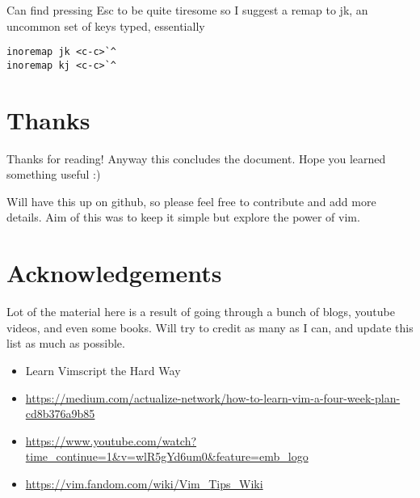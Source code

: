 \documentclass[12pt, letterpaper]{article}
\begin{document}
Can find pressing Esc to be quite tiresome so I suggest a remap to jk, an uncommon set of keys typed, essentially 

\begin{verbatim}
inoremap jk <c-c>`^
inoremap kj <c-c>`^
\end{verbatim}

\section{Thanks}
Thanks for reading! Anyway this concludes the document. Hope you learned something useful :)

Will have this up on github, so please feel free to contribute and add more details. Aim of this was to keep it simple but explore the power of vim.

\section{Acknowledgements}
Lot of the material here is a result of going through a bunch of blogs, youtube videos, and even some books. Will try to credit as many as I can, and update this list as much as possible.

\begin{itemize}
    \item Learn Vimscript the Hard Way
    \item \url{https://medium.com/actualize-network/how-to-learn-vim-a-four-week-plan-cd8b376a9b85}
    \item \url{https://www.youtube.com/watch?time_continue=1&v=wlR5gYd6um0&feature=emb_logo}
    \item \url{https://vim.fandom.com/wiki/Vim_Tips_Wiki}
\end{itemize}
\end{document}
